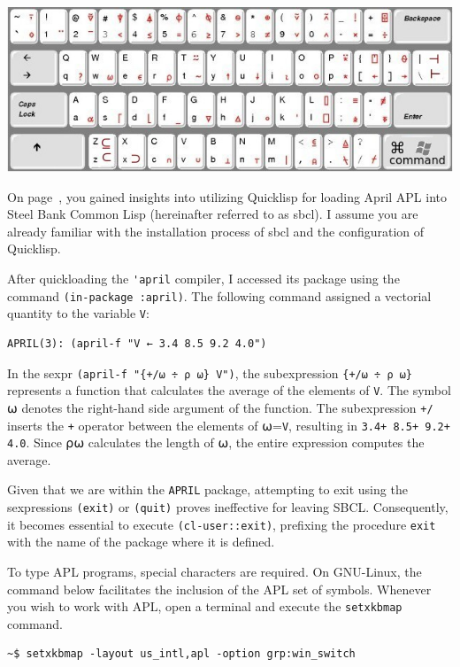 \documentclass[a4paper,12pt]{book}
\begin{document}
\verb||\\
{\hspace*{-0.8cm}
\includegraphics{figs/apl-keyboard.jpg}}
\label{april:keyboard}

On page~\pageref{april:install}, you gained insights into utilizing Quicklisp for loading April APL into Steel Bank Common Lisp (hereinafter referred to as sbcl). I assume you are already familiar with the installation process of sbcl and the configuration of Quicklisp.

After quickloading the \verb|'april| compiler,
I accessed its package using the
command \verb|(in-package :april)|. The following
command assigned a vectorial quantity to the variable \verb|V|:

\begin{lstlisting}[language=apl]
APRIL(3): (april-f "V ← 3.4 8.5 9.2 4.0")
\end{lstlisting}

In the sexpr \verb|(april-f "{+/⍵ ÷ ⍴ ⍵} V")|,
the subexpression \verb|{+/⍵ ÷ ⍴ ⍵}| represents a function that calculates the average of the elements of \verb|V|. The symbol ⍵ denotes the right-hand side argument of the function. The subexpression \verb|+/| inserts the \verb|+| operator between the elements of ⍵=\verb|V|, resulting in \verb|3.4+ 8.5+ 9.2+ 4.0|. Since ⍴⍵ calculates the length of ⍵, the entire expression computes the average.

Given that we are within the \verb|APRIL| package, attempting to exit using the sexpressions \verb|(exit)| or \verb|(quit)| proves ineffective for leaving SBCL. Consequently, it becomes essential to execute \verb|(cl-user::exit)|, prefixing the procedure \verb|exit| with the name of the package where it is defined.

To type APL programs, special characters are required. On GNU-Linux, the command below facilitates the inclusion of the APL set of symbols. Whenever you wish to work with APL, open a terminal and execute the \verb|setxkbmap| command.
\begin{verbatim}
~$ setxkbmap -layout us_intl,apl -option grp:win_switch
\end{verbatim}
\end{document}
